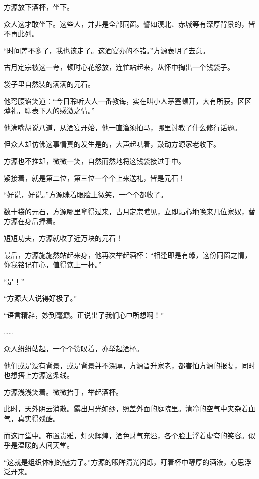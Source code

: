 
\begin{this_body}



方源放下酒杯，坐下。

众人这才敢坐下。这些人，并非是全部同窗。譬如漠北、赤城等有深厚背景的，皆不再此列。

“时间差不多了，我也该走了。这酒宴办的不错。”方源表明了去意。

古月定宗被这一夸，顿时心花怒放，连忙站起来，从怀中掏出一个钱袋子。

袋子里自然装的满满的元石。

他弯腰谄笑道：“今日聆听大人一番教诲，实在叫小人茅塞顿开，大有所获。区区薄礼，聊表下人的感激之情。”

他满嘴胡说八道，从酒宴开始，他一直溜须拍马，哪里讨教了什么修行话题。

但众人却仿佛这事情真的发生是的，大声起哄着，鼓动方源家老收下。

方源也不推却，微微一笑，自然而然地将这钱袋接过手中。

紧接着，就是第二位，第三位一个个上来送礼，皆是元石！

“好说，好说。”方源眯着眼脸上微笑，一个个都收了。

数十袋的元石，方源哪里拿得过来，古月定宗瞧见，立即贴心地唤来几位家奴，替方源在身后捧着。

短短功夫，方源就收了近万块的元石！

最后，方源施施然站起来身，他再次举起酒杯：“相逢即是有缘，这份同窗之情，你我铭记在心，值得饮上一杯。”

“是！”

“方源大人说得好极了。”

“语言精辟，妙到毫巅。正说出了我们心中所想啊！”

……

众人纷纷站起，一个个赞叹着，亦举起酒杯。

他们或是没有背景，或是背景并不深厚，方源晋升家老，都害怕方源的报复，同时也想搭上方源这条线。

方源浅浅笑着。微微抬手，举起酒杯。

此时，天外阴云消散。露出月光如纱，照盖外面的庭院里。清冷的空气中夹杂着血气，真实得残酷。

而这厅堂中。布置贵雅，灯火辉煌，酒色财气充溢，各个脸上浮着虚夸的笑容。似乎是温暖的人间天堂。

“这就是组织体制的魅力了。”方源的眼眸清光闪烁，盯着杯中醇厚的酒液，心思浮泛开来。


\end{this_body}
